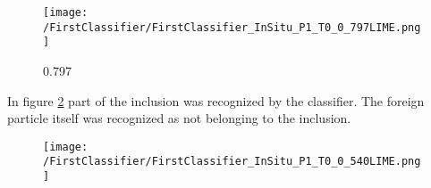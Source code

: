 \begin{figure}[H]
\centering
\texttt{[image: /FirstClassifier/FirstClassifier\_InSitu\_P1\_T0\_0\_797LIME.png]}
\caption{0.797}
\label{fig:InSituP1T0_2_LIME}
\end{figure}
In figure \ref{sub:InSituP1T10_1_LIME} part of the inclusion was recognized by the classifier. The foreign particle itself was recognized as not belonging to the inclusion.
%
\begin{figure}
\centering
\texttt{[image: /FirstClassifier/FirstClassifier\_InSitu\_P1\_T0\_0\_540LIME.png]}
\caption{}
\label{sub:InSituP1T10_1_LIME}
\end{figure}


%


